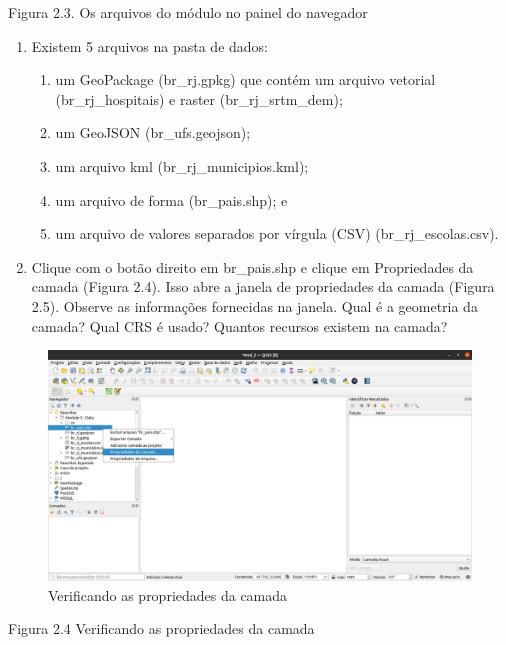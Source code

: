 \documentclass[
]{book}
\providecommand{\tightlist}{%
  \setlength{\itemsep}{0pt}\setlength{\parskip}{0pt}}
\begin{document}
Figura 2.3. Os arquivos do módulo no painel do navegador

\begin{enumerate}
\def\labelenumi{\arabic{enumi}.}
\setcounter{enumi}{5}
\item
  Existem 5 arquivos na pasta de dados:

  \begin{enumerate}
  \def\labelenumii{\arabic{enumii}.}
  \tightlist
  \item
    um GeoPackage (br\_rj.gpkg) que contém um arquivo vetorial (br\_rj\_hospitais) e raster (br\_rj\_srtm\_dem);
  \item
    um GeoJSON (br\_ufs.geojson);
  \item
    um arquivo kml (br\_rj\_municipios.kml);
  \item
    um arquivo de forma (br\_pais.shp); e
  \item
    um arquivo de valores separados por vírgula (CSV) (br\_rj\_escolas.csv).
  \end{enumerate}
\item
  Clique com o botão direito em br\_pais.shp e clique em Propriedades da camada (Figura 2.4). Isso abre a janela de propriedades da camada (Figura 2.5). Observe as informações fornecidas na janela. Qual é a geometria da camada? Qual CRS é usado? Quantos recursos existem na camada?
\end{enumerate}

\begin{figure}
\centering
\includegraphics{media/modulo2/qgis-browser-3.png}
\caption{Verificando as propriedades da camada}
\end{figure}

Figura 2.4 Verificando as propriedades da camada
\end{document}
